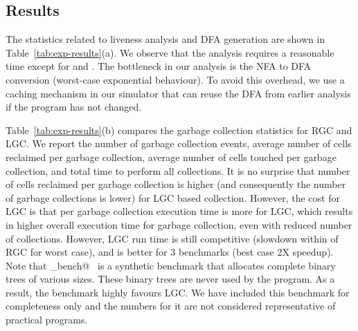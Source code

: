 \documentclass[preprint, 9pt]{sigplanconf}
\newcommand{\warning}[1]{{\color{Myred}{#1}}}
\begin{document}




\subsection{Results}

The statistics related to liveness analysis and DFA generation are shown in
Table~\ref{tab:exp-results}(a). We observe that the analysis requires
a reasonable time except for  \verb@treejoin@ and  \verb@sudoku@. 
The bottleneck in our analysis is the NFA to DFA conversion
(worst-case exponential behaviour). To avoid this 
overhead, we use a caching mechanism in our simulator that can
reuse the DFA from earlier analysis if the program has not changed.

Table~\ref{tab:exp-results}(b)   compares   the   garbage   collection
statistics  for RGC  and  LGC.  We  report the  number  of garbage collection  events,
average  number of  cells reclaimed  per garbage collection,  average number  of cells
touched  per garbage collection,  and  total time  to
perform  all collections.   It is  no  surprise that  number of  cells
reclaimed per  garbage collection is  higher (and  consequently the  number of  garbage collections is
lower)  for LGC  based collection.   However, the cost  for LGC is that per garbage collection
execution  time is  more  for  LGC, which  results  in higher  overall
execution time  for garbage  collection, even  with reduced  number of
collections.   However, LGC  run time  is still  competitive (slowdown
within \warning{5X} of RGC for worst case), and is better for 3 benchmarks (best
case  2X speedup).   Note  that  \verb@gc_bench@~\cite{gc_bench} is  a
synthetic benchmark  that allocates complete binary  trees of various
sizes.  These binary trees are never used by the program. As a result,
the benchmark highly favours LGC.  We have included this benchmark for
completeness  only  and   the  numbers  for  it   are  not  considered
representative of practical programs.
\end{document}
